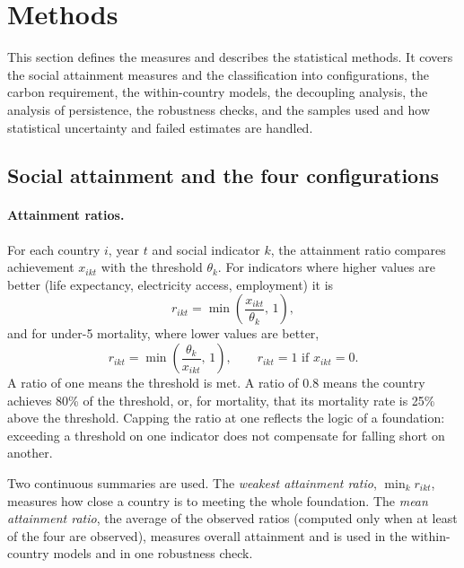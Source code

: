 \section{Methods}\label{sec:methods}

This section defines the measures and describes the statistical methods. It covers the social attainment measures and the classification into configurations, the carbon requirement, the within-country models, the decoupling analysis, the analysis of persistence, the robustness checks, and the samples used and how statistical uncertainty and failed estimates are handled.

\subsection{Social attainment and the four configurations}

\paragraph{Attainment ratios.} For each country $i$, year $t$ and social indicator $k$, the attainment ratio compares achievement $x_{ikt}$ with the threshold $\theta_k$. For indicators where higher values are better (life expectancy, electricity access, employment) it is
\begin{equation}
r_{ikt} = \min\!\left(\frac{x_{ikt}}{\theta_k},\, 1\right),
\end{equation}
and for under-5 mortality, where lower values are better,
\begin{equation}
r_{ikt} = \min\!\left(\frac{\theta_k}{x_{ikt}},\, 1\right), \qquad r_{ikt}=1 \text{ if } x_{ikt}=0.
\end{equation}
A ratio of one means the threshold is met. A ratio of 0.8 means the country achieves 80\% of the threshold, or, for mortality, that its mortality rate is 25\% above the threshold. Capping the ratio at one reflects the logic of a foundation: exceeding a threshold on one indicator does not compensate for falling short on another.

Two continuous summaries are used. The \emph{weakest attainment ratio}, $\min_k r_{ikt}$, measures how close a country is to meeting the whole foundation. The \emph{mean attainment ratio}, the average of the observed ratios (computed only when at least \nMinSocial{} of the four are observed), measures overall attainment and is used in the within-country models and in one robustness check.

